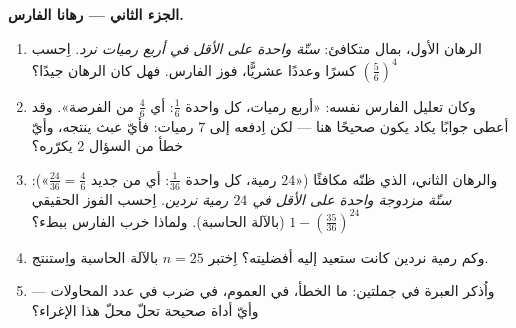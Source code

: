 \begin{problem}
\medskip
\noindent\textbf{الجزء الثاني --- رهانا الفارس.}
\begin{enumerate}[resume]
  \item الرهان الأول، بمال متكافئ: \emph{ستّة واحدة على
        الأقل في أربع رميات نرد}. اِحسب
        $\left(\frac56\right)^4$ كسرًا وعددًا عشريًّا،
         فوز الفارس. فهل كان الرهان جيدًا؟
  \item وكان تعليل الفارس نفسه: «أربع رميات، كل واحدة
        $\frac16$: أي $\frac46$ من الفرصة». وقد أعطى جوابًا
        يكاد يكون صحيحًا هنا --- لكن اِدفعه إلى $7$ رميات: فأيّ
        عبث ينتجه، وأيّ خطأ من السؤال 2 يكرّره؟
  \item والرهان الثاني، الذي ظنّه مكافئًا 
        («$24$ رمية، كل واحدة $\frac1{36}$: أي من جديد
        $\frac{24}{36} = \frac46$»): \emph{ستّة مزدوجة واحدة
        على الأقل في $24$ رمية نردين}. اِحسب  الفوز
        الحقيقي $1 - \left(\frac{35}{36}\right)^{24}$
        (بالآلة الحاسبة). ولماذا خرب الفارس ببطء؟
  \item وكم رمية نردين كانت ستعيد إليه أفضليته؟ اِختبر $n = 25$
        بالآلة الحاسبة واِستنتج.
  \item واُذكر العبرة في جملتين: ما الخطأ، في العموم، في ضرب
         في عدد المحاولات --- وأيّ أداة صحيحة تحلّ محلّ
        هذا الإغراء؟
\end{enumerate}


\end{problem}

